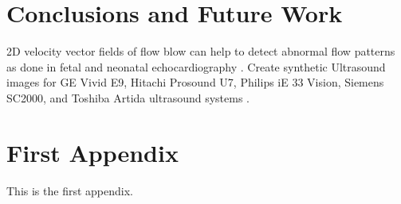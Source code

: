 \documentclass[mlabstract,twocolumn]{jmlr}
\begin{document}
\section{Conclusions and Future Work}
2D velocity vector fields of flow blow can help to detect abnormal flow patterns as done in fetal and neonatal echocardiography \citep{Meyers2020}.
Create synthetic Ultrasound images for GE Vivid E9, Hitachi Prosound U7, Philips iE 33 Vision, Siemens SC2000, and Toshiba Artida ultrasound systems \citep{brindise2020unsupervised}.






\appendix

\section{First Appendix}\label{apd:first}
This is the first appendix.
\end{document}
